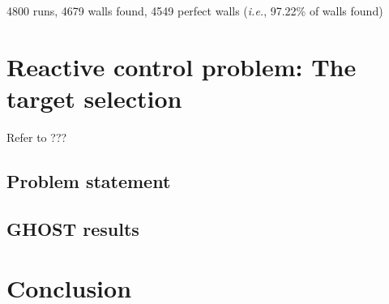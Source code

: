 \documentclass[journal]{IEEEtran}
\newcommand{\ghost}{\textsc{GHOST}\xspace}
\newcommand{\ie}{\textit{i.e.}}
\begin{document}
4800 runs, 4679 walls found, 4549 perfect walls (\ie, 97.22\% of walls found) 

\section{Reactive control problem: The target selection}\label{sec:target}
Refer to ???
\subsection{Problem statement}
\subsection{\ghost results}


\section{Conclusion}\label{sec:conclusion}








\ifCLASSOPTIONcaptionsoff
  \newpage
\fi

                                                    





\end{document}
